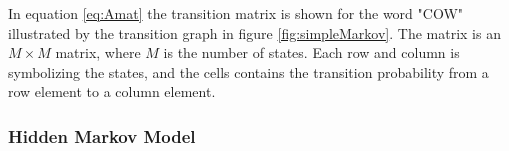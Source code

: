 In equation \ref{eq:Amat} the transition matrix is shown for the word "COW" illustrated by the transition graph in figure \ref{fig:simpleMarkov}. The matrix is an $M\times M$ matrix, where $M$ is the number of states. Each row and column is symbolizing the states, and the cells contains the transition probability from a row element to a column element.


\subsubsection{Hidden Markov Model}

